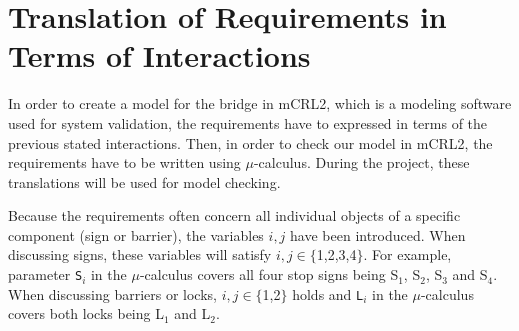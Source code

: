 \section{Translation of Requirements in Terms of Interactions}
\label{sec:trans}

In order to create a model for the bridge in mCRL2, which is a modeling software used for system validation, the requirements have to expressed in terms of the previous stated interactions. Then, in order to check our model in mCRL2, the requirements have to be written using $\mu$-calculus. During the project, these translations will be used for model checking.

Because the requirements often concern all individual objects of a specific component (sign or barrier), the variables $i, j$ have been introduced. When discussing signs, these variables will satisfy $i,j \in \{$1,2,3,4$\}$. For example, parameter \texttt{S$_i$} in the $\mu$-calculus covers all four stop signs being S$_1$, S$_2$, S$_3$ and S$_4$. When discussing barriers or locks, $i,j \in \{$1,2$\}$ holds and \texttt{L$_i$} in the $\mu$-calculus covers both locks being L$_1$ and L$_2$.
%
